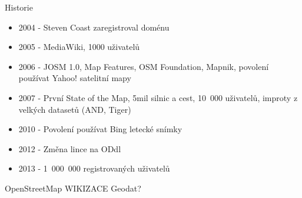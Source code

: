 \documentclass[xcolor=dvipsnames]{beamer}
\begin{document}
\begin{frame}{Historie}
       \begin{itemize}
            \item 2004 - Steven Coast zaregistroval doménu
            \item 2005 - MediaWiki, 1000 uživatelů
            \item 2006 - JOSM 1.0, Map Features, OSM Foundation, Mapnik, povolení používat Yahoo! satelitní mapy
            \item 2007 - První State of the Map, 5mil silnic a cest, 10~000 uživatelů, improty z velkých datasetů (AND, Tiger)
            \item 2010 - Povolení používat Bing letecké snímky
            \item 2012 - Změna lince na ODdl
            \item 2013 - 1~000~000 registrovaných uživatelů
       \end{itemize}
\end{frame}

\begin{frame}{OpenStreetMap}
WIKIZACE Geodat?
\end{frame}
\end{document}
